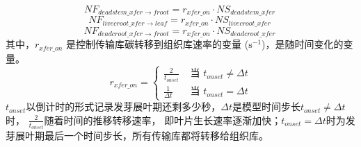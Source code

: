 \begin{enumerate}
\begin{equation}
  NF_{deadstem\_{xfer}\rightarrow froot} = r_{{xfer}\_{on}}\cdot NS_{deadstem\_{xfer}}\ 
\end{equation}
\begin{equation}
  NF_{livecroot\_{xfer}\rightarrow leaf} = r_{{xfer}\_{on}}\cdot NS_{livecroot\_{xfer}}\ 
\end{equation}
\begin{equation}
  NF_{deadcroot\_{xfer}\rightarrow froot} = r_{{xfer}\_{on}}\cdot NS_{deadcroot\_{xfer}}\ 
\end{equation}
其中，$r_{{xfer}\_{on}}$ 是控制传输库碳转移到组织库速率的变量 ($\mathrm{s^{-1}}$)，是随时间变化的变量。
\begin{equation}
r_{xfer\_{on}}=\left\{\begin{array}{ll}\frac{2}{t_{ {onset}}} &  \text{ 当 }  t_{ {onset}} \neq \Delta t \\ 
\frac{1}{\Delta t} &  \text{ 当 }  t_{onset}=\Delta t\end{array}\right.
\end{equation}
$t_{onset}$以倒计时的形式记录发芽展叶期还剩多少秒，$\Delta t$是模型时间步长$t_{onset}\neq\Delta t$时，
$\frac{2}{t_{onset}}$随着时间的推移转移速率，
即叶片生长速率逐渐加快；$t_{onset}=\Delta t$时为发芽展叶期最后一个时间步长，所有传输库都将转移给组织库。\\


\end{enumerate}
